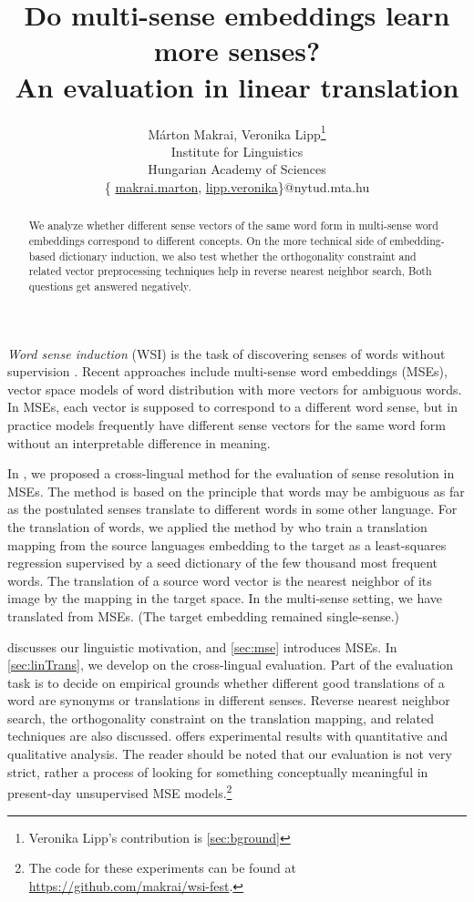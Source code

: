 \documentclass[11pt]{article}
\title{Do multi-sense embeddings learn more senses? \\ An evaluation in linear
translation}
\author{
  Márton Makrai, Veronika Lipp\thanks{\hspace{2pt} Veronika Lipp's contribution is
  \cref{sec:bground}}
  \\ Institute for Linguistics\\
  Hungarian Academy of Sciences \\
  \{ 
  \href{mailto:makrai.hlt@gmail.com}{makrai.marton}, 
  \href{mailto:lipp.veronika@nytud.mta.hu}{lipp.veronika}\}@nytud.mta.hu \\
}
\date{}
\begin{document}
\maketitle


\begin{abstract}
  We analyze whether different sense vectors of the same word form in
  multi-sense word embeddings correspond to different concepts. On the more
  technical side of embedding-based dictionary induction, we also test whether
  the orthogonality constraint and related vector preprocessing techniques help
  in reverse nearest neighbor search, Both questions get answered negatively.
\end{abstract}

\emph{Word sense induction} (WSI) is the task of discovering senses of words
without supervision \citep{Schutze:1998}. Recent approaches include multi-sense
word embeddings (MSEs), vector space models of word distribution with more
vectors for ambiguous words. In MSEs, each vector is supposed to correspond
to a different word sense, but in practice models frequently have different
sense vectors for the same word form without an interpretable difference in
meaning.

In \cite{Borbely:2016}, we proposed a cross-lingual method for the evaluation
of sense resolution in MSEs. The method is based on the principle that
words may be ambiguous as far as the postulated senses translate to different
words in some other language.  For the translation of words, we applied the
method by \citet{Mikolov:2013x} who train a translation mapping from the source
languages embedding to the target as a least-squares regression supervised by a
seed dictionary of the few thousand most frequent words. The translation of a
source word vector is the nearest neighbor of its image by the mapping in the
target space. In the multi-sense setting, we have translated from MSEs. (The
target embedding remained single-sense.)

 discusses our linguistic motivation, and \cref{sec:mse}
introduces MSEs.  In \cref{sec:linTrans}, we develop on the cross-lingual
evaluation. Part of the evaluation task is to decide on empirical grounds
whether different good translations of a word are synonyms or translations in
different senses.  Reverse nearest neighbor search, the orthogonality constraint
on the translation mapping, and related techniques are also discussed.
 offers experimental results with quantitative and qualitative
analysis.  The reader should be noted that our evaluation is not very strict,
rather a process of looking for something conceptually meaningful in
present-day unsupervised MSE models.\footnote{The code for these experiments
can be found at \url{https://github.com/makrai/wsi-fest}.}
\end{document}
